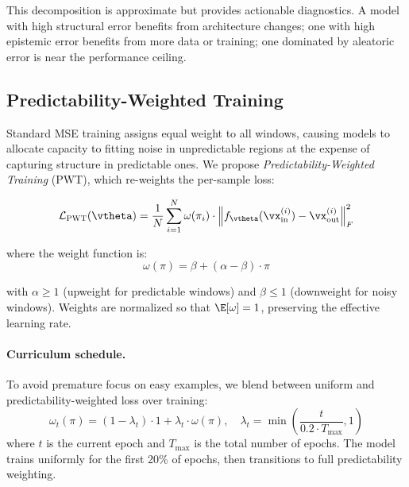 \documentclass[10pt]{article}
\newcommand{\pwt}{\textsc{PWT}}
\newcommand{\predscore}{\pi}
\begin{document}
This decomposition is approximate but provides actionable diagnostics. A model with high structural error benefits from architecture changes; one with high epistemic error benefits from more data or training; one dominated by aleatoric error is near the performance ceiling.

\subsection{Predictability-Weighted Training}
\label{sec:pwt}

Standard MSE training assigns equal weight to all windows, causing models to allocate capacity to fitting noise in unpredictable regions at the expense of capturing structure in predictable ones. We propose \emph{Predictability-Weighted Training} (\pwt{}), which re-weights the per-sample loss:

\begin{equation}
    \mathcal{L}_{\pwt{}}(\vtheta) = \frac{1}{N} \sum_{i=1}^{N} \omega(\predscore_i) \cdot \left\| f_\vtheta(\vx^{(i)}_{\text{in}}) - \vx^{(i)}_{\text{out}} \right\|^2_F
    \label{eq:pwt}
\end{equation}

where the weight function is:
\begin{equation}
    \omega(\predscore) = \beta + (\alpha - \beta) \cdot \predscore
\end{equation}

with $\alpha \geq 1$ (upweight for predictable windows) and $\beta \leq 1$ (downweight for noisy windows). Weights are normalized so that $\E[\omega] = 1$, preserving the effective learning rate.

\paragraph{Curriculum schedule.} To avoid premature focus on easy examples, we blend between uniform and predictability-weighted loss over training:
\begin{equation}
    \omega_t(\predscore) = (1 - \lambda_t) \cdot 1 + \lambda_t \cdot \omega(\predscore), \quad \lambda_t = \min\left(\frac{t}{0.2 \cdot T_{\max}}, 1\right)
\end{equation}
where $t$ is the current epoch and $T_{\max}$ is the total number of epochs. The model trains uniformly for the first 20\% of epochs, then transitions to full predictability weighting.
\end{document}
